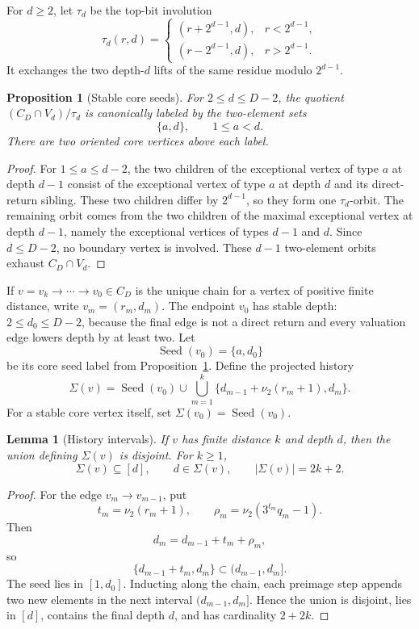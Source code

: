 \documentclass[11pt]{article}
\newtheorem{proposition}[theorem]{Proposition}
\newtheorem{lemma}[theorem]{Lemma}
\theoremstyle{definition}
\theoremstyle{remark}
\newcommand{\nuu}{\nu_2}
\newcommand{\Seed}{\operatorname{Seed}}
\begin{document}
For $d\ge2$, let $\tau_d$ be the top-bit involution
\[
\tau_d(r,d)=
\begin{cases}
(r+2^{d-1},d),&r<2^{d-1},\\
(r-2^{d-1},d),&r>2^{d-1}.
\end{cases}
\]
It exchanges the two depth-$d$ lifts of the same residue modulo $2^{d-1}$.

\begin{proposition}[Stable core seeds]\label{prop:seeds}
For $2\le d\le D-2$, the quotient $(C_D\cap V_d)/\tau_d$ is canonically labeled by the two-element sets
\[
\{a,d\},\qquad 1\le a<d.
\]
There are two oriented core vertices above each label.
\end{proposition}

\begin{proof}
For $1\le a\le d-2$, the two children of the exceptional vertex of type $a$ at depth $d-1$ consist of the exceptional vertex of type $a$ at depth $d$ and its direct-return sibling.  These two children differ by $2^{d-1}$, so they form one $\tau_d$-orbit.  The remaining orbit comes from the two children of the maximal exceptional vertex at depth $d-1$, namely the exceptional vertices of types $d-1$ and $d$.  Since $d\le D-2$, no boundary vertex is involved.  These $d-1$ two-element orbits exhaust $C_D\cap V_d$.
\end{proof}

If $v=v_k\to\cdots\to v_0\in C_D$ is the unique chain for a vertex of positive finite distance, write $v_m=(r_m,d_m)$.  The endpoint $v_0$ has stable depth: $2\le d_0\le D-2$, because the final edge is not a direct return and every valuation edge lowers depth by at least two.  Let
\[
\Seed(v_0)=\{a,d_0\}
\]
be its core seed label from Proposition~\ref{prop:seeds}.  Define the projected history
\[
\Sigma(v)=\Seed(v_0)\cup\bigcup_{m=1}^k\{d_{m-1}+\nuu(r_m+1),d_m\}.
\]
For a stable core vertex itself, set $\Sigma(v_0)=\Seed(v_0)$.

\begin{lemma}[History intervals]\label{lem:historyintervals}
If $v$ has finite distance $k$ and depth $d$, then the union defining $\Sigma(v)$ is disjoint.  For $k\ge1$,
\[
\Sigma(v)\subseteq[d],\qquad d\in\Sigma(v),\qquad |\Sigma(v)|=2k+2.
\]
\end{lemma}

\begin{proof}
For the edge $v_m\to v_{m-1}$, put
\[
t_m=\nuu(r_m+1),\qquad \rho_m=\nuu(3^{t_m}q_m-1).
\]
Then
\[
d_m=d_{m-1}+t_m+\rho_m,
\]
so
\[
\{d_{m-1}+t_m,d_m\}\subset(d_{m-1},d_m].
\]
The seed lies in $[1,d_0]$.  Inducting along the chain, each preimage step appends two new elements in the next interval $(d_{m-1},d_m]$.  Hence the union is disjoint, lies in $[d]$, contains the final depth $d$, and has cardinality $2+2k$.
\end{proof}
\end{document}
